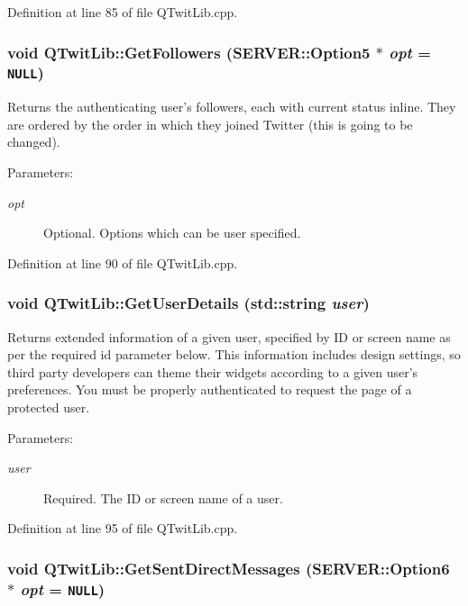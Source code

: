 Definition at line 85 of file QTwitLib.cpp.\hypertarget{classQTwitLib_e4bdc7e46040d27e8945b912a9f84541}{
\subsubsection{\setlength{\rightskip}{0pt plus 5cm}void QTwitLib::GetFollowers ({\bf SERVER::Option5} $\ast$ {\em opt} = {\tt NULL})}}
\label{classQTwitLib_e4bdc7e46040d27e8945b912a9f84541}


Returns the authenticating user's followers, each with current status inline. They are ordered by the order in which they joined Twitter (this is going to be changed). \begin{Desc}
\item[Parameters:]
\begin{description}
\item[{\em opt}]Optional. Options which can be user specified. \end{description}
\end{Desc}


Definition at line 90 of file QTwitLib.cpp.\hypertarget{classQTwitLib_9361839a5b059781f143e237dc31fddb}{
\subsubsection{\setlength{\rightskip}{0pt plus 5cm}void QTwitLib::GetUserDetails (std::string {\em user})}}
\label{classQTwitLib_9361839a5b059781f143e237dc31fddb}


Returns extended information of a given user, specified by ID or screen name as per the required id parameter below. This information includes design settings, so third party developers can theme their widgets according to a given user's preferences. You must be properly authenticated to request the page of a protected user. \begin{Desc}
\item[Parameters:]
\begin{description}
\item[{\em user}]Required. The ID or screen name of a user. \end{description}
\end{Desc}


Definition at line 95 of file QTwitLib.cpp.\hypertarget{classQTwitLib_9171d183e65f495b24d98d8440f037b7}{
\subsubsection{\setlength{\rightskip}{0pt plus 5cm}void QTwitLib::GetSentDirectMessages ({\bf SERVER::Option6} $\ast$ {\em opt} = {\tt NULL})}}
\label{classQTwitLib_9171d183e65f495b24d98d8440f037b7}


